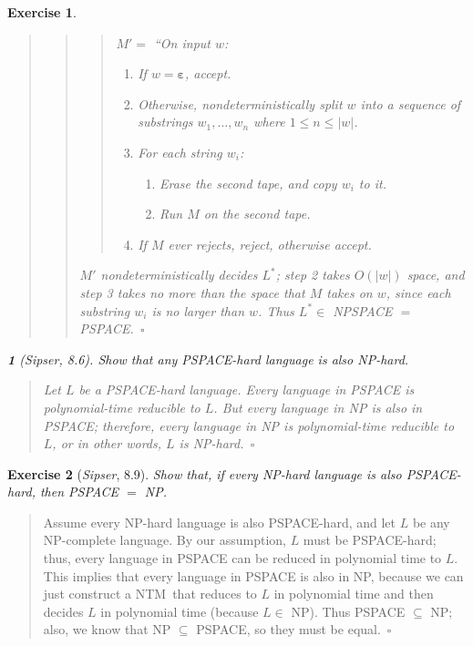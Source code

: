 \documentclass{article}
\theoremstyle{break}			%
\newtheorem{exercise}{Exercise}
\theoremstyle{plain}
\newtheorem{subexercise}{}[exercise]
\newenvironment{answer}{\begin{quotation}\noindent}{\end{quotation}}
\newcommand{\sipser}{\textit{Sipser}}
\renewcommand{\qed}{~\ensuremath{\square}}
\newcommand{\NTM}{\textsf{NTM}}
\newcommand{\emptystring}{\ensuremath{\boldsymbol\varepsilon}}
\begin{document}
\begin{exercise}
\begin{answer}
\begin{answer}
\begin{answer}
$M' =$ ``On input $w$:
\begin{enumerate}
\item If $w=\emptystring$, accept.
\item Otherwise, nondeterministically split $w$ into a sequence of substrings
$w_1,\ldots,w_n$ where $1\leq n \leq |w|$.
\item For each string $w_i$:
	\begin{enumerate}
	\item Erase the second tape, and copy $w_i$ to it.
	\item Run $M$ on the second tape.
	\end{enumerate}
\item If $M$ ever rejects, reject, otherwise accept.
\end{enumerate}
\end{answer}
$M'$ nondeterministically decides $L^*$; step 2 takes $O(|w|)$ space,
and step 3 takes no more than the space that $M$ takes on $w$, since
each substring $w_i$ is no larger than $w$.  Thus $L^*\in$ NPSPACE $=$
PSPACE.\qed
\end{answer}
\end{answer}

\begin{subexercise}[\sipser, 8.6]\label{PSPACE-hard}
Show that any PSPACE-hard language is also NP-hard.
\end{subexercise}
\begin{answer}
Let $L$ be a PSPACE-hard language.  Every language in PSPACE is
polynomial-time reducible to $L$.  But every language in NP is also in
PSPACE; therefore, every language in NP is polynomial-time reducible
to $L$, or in other words, $L$ is NP-hard.\qed
\end{answer}
\end{exercise}

\begin{exercise}[\sipser, 8.9]
Show that, if every NP-hard language is also PSPACE-hard, then PSPACE
$=$ NP.
\end{exercise}
\begin{answer}
Assume every NP-hard language is also PSPACE-hard, and let $L$ be any
NP-complete language.  By our assumption, $L$ must be PSPACE-hard;
thus, every language in PSPACE can be reduced in polynomial time to
$L$.  This implies that every language in PSPACE is also in NP,
because we can just construct a \NTM\ that reduces to $L$ in
polynomial time and then decides $L$ in polynomial time (because
$L\in$ NP).  Thus PSPACE $\subseteq$ NP; also, we know that NP
$\subseteq$ PSPACE, so they must be equal.\qed
\end{answer}
\end{document}
